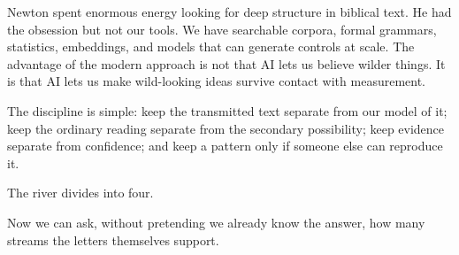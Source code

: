 Newton spent enormous energy looking for deep structure in biblical text. He had the obsession but not our tools. We have searchable corpora, formal grammars, statistics, embeddings, and models that can generate controls at scale. The advantage of the modern approach is not that AI lets us believe wilder things. It is that AI lets us make wild-looking ideas survive contact with measurement.

The discipline is simple: keep the transmitted text separate from our model of it; keep the ordinary reading separate from the secondary possibility; keep evidence separate from confidence; and keep a pattern only if someone else can reproduce it.

The river divides into four.

Now we can ask, without pretending we already know the answer, how many streams the letters themselves support.


